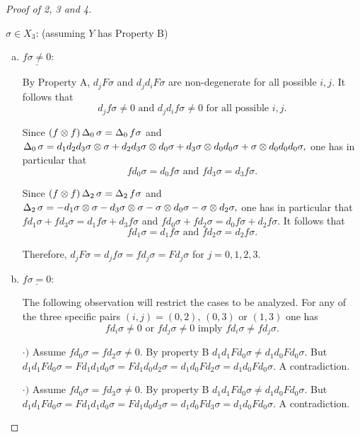\documentclass[main.tex]{subfiles}
\begin{document}
\begin{proof}[Proof of 2, 3 and 4]
\begin{enumerate}[a)]
\begin{enumerate}[i)]
        \end{enumerate}
    \end{enumerate}
$\sigma\in X_3$: (assuming $Y$ has Property B) \par
    \begin{enumerate}[a)]
    \item $\underline{f\sigma\neq0}$: \vspace*{5pt}\par

    By Property A, $d_jF\sigma$ and $d_jd_iF\sigma$ are non-degenerate for all possible $i,j$. It follows that $$d_jf\sigma\neq0 \text{ and } d_jd_if\sigma\neq 0 \text{ for all possible }i,j.$$ \par

    Since $(f\otimes f)\operatorname{\Delta}_0\sigma=\operatorname{\Delta}_0f\sigma$ and
    $\operatorname{\Delta}_0\sigma=d_1d_2d_3\sigma\otimes\sigma + d_2d_3\sigma\otimes d_0\sigma + d_3\sigma\otimes d_0d_0\sigma + \sigma\otimes d_0d_0d_0\sigma,$
    one has in particular that $$fd_0\sigma=d_0f\sigma\text{ and }fd_3\sigma=d_3f\sigma.$$

    Since $(f\otimes f)\operatorname{\Delta}_2\sigma=\operatorname{\Delta}_2f\sigma$ and
    $\operatorname{\Delta}_2\sigma=-d_1\sigma\otimes\sigma - d_3\sigma\otimes\sigma - \sigma\otimes d_0\sigma - \sigma\otimes d_2\sigma,$
    one has in particular that $fd_1\sigma+fd_3\sigma=d_1f\sigma+d_3f\sigma$ and $fd_0\sigma+fd_2\sigma=d_0f\sigma+d_2f\sigma$. It follows that $$fd_1\sigma=d_1f\sigma\text{ and }fd_2\sigma=d_2f\sigma.$$

    Therefore, $d_jF\sigma=d_jf\sigma=fd_j\sigma=Fd_j\sigma$ for $j=0,1,2,3$. \par

    \item $\underline{f\sigma=0}$: \vspace*{5pt}\par

    The following observation will restrict the cases to be analyzed. For any of the three specific pairs $(i,j)=(0,2)$, $(0,3)$ or $(1,3)$ one has $$fd_i\sigma\neq 0\text{ or } fd_j\sigma\neq 0 \text{ imply } fd_i\sigma\neq fd_j\sigma.$$

    $\cdot)$ Assume $fd_0\sigma=fd_2\sigma\neq0$. By property B $d_1d_1Fd_0\sigma\neq d_1d_0Fd_0\sigma$. But $d_1d_1Fd_0\sigma=Fd_1d_1d_0\sigma=Fd_1d_0d_2\sigma=d_1d_0Fd_2\sigma=d_1d_0Fd_0\sigma$. A contradiction. \par

    $\cdot)$ Assume $fd_0\sigma=fd_3\sigma\neq0$. By property B $d_1d_1Fd_0\sigma\neq d_1d_0Fd_0\sigma$. But $d_1d_1Fd_0\sigma=Fd_1d_1d_0\sigma=Fd_1d_0d_3\sigma=d_1d_0Fd_3\sigma=d_1d_0Fd_0\sigma$. A contradiction. \par


\end{enumerate}
\end{proof}
\end{document}
